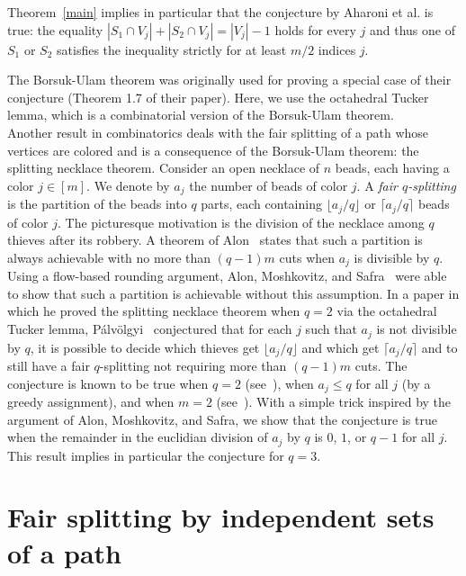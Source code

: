 \documentclass[12pt]{amsart}
\theoremstyle{remark}
\begin{document}
 Theorem~\ref{main} implies in particular that the conjecture by Aharoni et al. is true: the equality $|S_1\cap V_j|+|S_2\cap V_j|= |V_j|-1$ holds for every $j$ and thus one of $S_1$ or $S_2$ satisfies the inequality strictly for at least $m/2$ indices $j$.

The Borsuk-Ulam theorem was originally used for proving a special case of their conjecture (Theorem 1.7 of their paper). Here, we use the octahedral Tucker lemma, which is a combinatorial version of the Borsuk-Ulam theorem. \\

Another result in combinatorics deals with the fair splitting of a path whose vertices are colored and is a consequence of the Borsuk-Ulam theorem: the splitting necklace theorem. Consider an open necklace of $n$ beads, each having a color $j\in[m]$. We denote by $a_j$ the number of beads of color $j$. A {\em fair $q$-splitting} is the partition of the beads into $q$ parts, each containing $\lfloor a_j/q\rfloor$ or $\lceil a_j/q\rceil$ beads of color $j$. The picturesque motivation is the division of the necklace among $q$ thieves after its robbery. A theorem of Alon~\cite{alon1987splitting} states that such a partition is always achievable with no more than $(q-1)m$ cuts when $a_j$ is divisible by $q$. Using a flow-based rounding argument, Alon, Moshkovitz, and Safra~\cite{alon2006algorithmic} were able to show that such a partition is achievable without this assumption. 
In a paper in which he proved the splitting necklace theorem when $q=2$ via the octahedral Tucker lemma, P{\'a}lv{\"o}lgyi~\cite{palvolgyi2009combinatorial} conjectured that for each $j$ such that $a_j$ is not divisible by $q$, it is possible to decide which thieves get $\lfloor a_j/q\rfloor$ and which get $\lceil a_j/q\rceil$ and to still have a fair $q$-splitting not requiring more than $(q-1)m$ cuts. The conjecture is known to be true when $q=2$ (see~\cite{palvolgyi2009combinatorial}), when $a_j\leq q$ for all $j$ (by a greedy assignment), and when $m=2$ (see~\cite{meunier2014simplotopal}).
With a simple trick inspired by the argument of Alon, Moshkovitz, and Safra, we show that the conjecture is true when the remainder in the euclidian division of $a_j$ by $q$ is $0$, $1$, or $q-1$ for all $j$. This result implies in particular the conjecture for $q=3$.

\section{Fair splitting by independent sets of a path}
\end{document}
